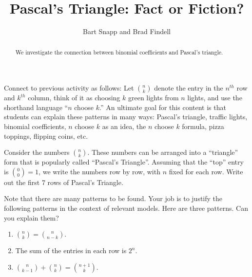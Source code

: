 \documentclass[nooutcomes]{ximera}
\title{Pascal's Triangle: Fact or Fiction?}
\author{Bart Snapp and Brad Findell}
\begin{document}
\begin{abstract}
  We investigate the connection between binomial coefficients and
  Pascal's triangle.
\end{abstract}
\maketitle

\label{A:factOrFiction}

\begin{teachingnote}
Connect to previous activity as follows:  Let $\binom{n}{k}$ denote the entry in the $n^{th}$ row and $k^{th}$ column, think of it as choosing $k$ green lights from $n$ lights, and use the shorthand language ``$n$ choose $k$.''  An ultimate goal for this content is that students can explain these patterns in many ways: Pascal's triangle, traffic lights, binomial coefficients, $n$ choose $k$ as an idea, the $n$ choose $k$ formula, pizza toppings, flipping coins, etc.
\end{teachingnote}
\begin{problem}
Consider the numbers $\binom{n}{k}$.  These numbers can be arranged
into a ``triangle'' form that is popularly called ``Pascal's
Triangle''.  Assuming that the ``top'' entry is $\binom{0}{0}=1$, we
write the numbers row by row, with $n$ fixed for each row.  Write out
the first 7 rows of Pascal's Triangle.

\vspace{3in}


Note that there are many patterns to be found.  Your job is to justify
the following patterns in the context of relevant models. Here are three patterns.  Can you explain them?
\begin{enumerate}
\item $\binom{n}{k} = \binom{n}{n-k}$.
\item The sum of the entries in each row is $2^n$.
\item $\binom{n}{k-1} + \binom{n}{k} = \binom{n+1}{k}$.
\end{enumerate}
\end{problem}
\end{document}
